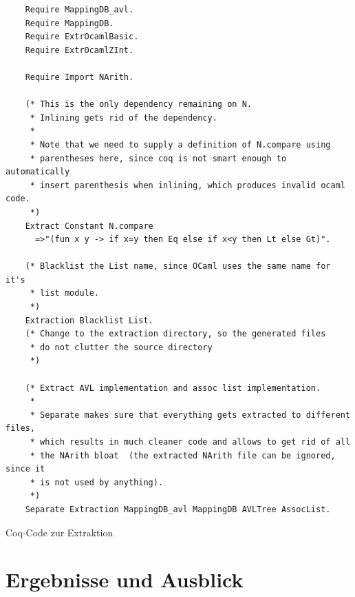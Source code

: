 \documentclass[a4paper, parskip]{scrartcl}
\begin{document}
\begin{listing}[htp]
  \begin{verbatim}
    Require MappingDB_avl.
    Require MappingDB.
    Require ExtrOcamlBasic.
    Require ExtrOcamlZInt.
     
    Require Import NArith.
     
    (* This is the only dependency remaining on N. 
     * Inlining gets rid of the dependency. 
     *
     * Note that we need to supply a definition of N.compare using 
     * parentheses here, since coq is not smart enough to automatically 
     * insert parenthesis when inlining, which produces invalid ocaml code.
     *)
    Extract Constant N.compare
      =>"(fun x y -> if x=y then Eq else if x<y then Lt else Gt)".

    (* Blacklist the List name, since OCaml uses the same name for it's 
     * list module.  
     *)
    Extraction Blacklist List. 
    (* Change to the extraction directory, so the generated files 
     * do not clutter the source directory 
     *)
     
    (* Extract AVL implementation and assoc list implementation.
     * 
     * Separate makes sure that everything gets extracted to different files, 
     * which results in much cleaner code and allows to get rid of all 
     * the NArith bloat  (the extracted NArith file can be ignored, since it
     * is not used by anything).
     *)
    Separate Extraction MappingDB_avl MappingDB AVLTree AssocList.
  \end{verbatim}
  \caption{Coq-Code zur Extraktion}
  \label{lst:extract}
\end{listing}

\section{Ergebnisse und Ausblick}
\end{document}
